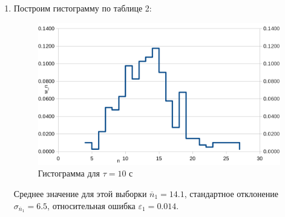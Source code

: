 \documentclass[a4paper, 12pt]{article}
\begin{document}
\begin{enumerate}
		\item Построим гистограмму по таблице 2:
		\begin{figure}[H]
			\centering
			\caption{Гистограмма для $\tau = 10$ с}
			\includegraphics[scale = 0.4]{data/hist_10.png}
		\end{figure}

		Среднее значение для этой выборки $\overline{n}_1 = 14.1$, стандартное отклонение
		$\sigma_{\overline{n}_1} = 6.5$, относительная ошибка $\varepsilon_1 = 0.014$.


\end{enumerate}
\end{document}
